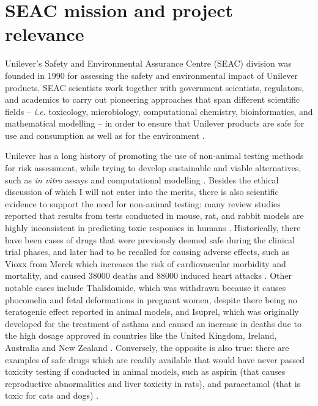 \section{SEAC mission and project relevance}
Unilever's Safety and Environmental Assurance Centre (SEAC) division was founded in 1990 for assessing the safety and environmental impact of Unilever products. SEAC scientists work together with government scientists, regulators, and academics to carry out pioneering approaches that span different scientific fields -- \textit{i.e.} toxicology, microbiology, computational chemistry, bioinformatics, and mathematical modelling -- in order to ensure that Unilever products are safe for use and consumption as well as for the environment \citep{unileverLeadingSafetyEnvironmental2023}.

Unilever has a long history of promoting the use of non-animal testing methods for risk assessment, while trying to develop sustainable and viable alternatives, such as \textit{in vitro} assays and computational modelling \citep{unileverAlternativesAnimalTesting2023}. Besides the ethical discussion of which I will not enter into the merits, there is also scientific evidence to support the need for non-animal testing: many review studies reported that results from tests conducted in mouse, rat, and rabbit models are highly inconsistent in predicting toxic responses in humans \citep{vannormanLimitationsAnimalStudies2020}. Historically, there have been cases of drugs that were previously deemed safe during the clinical trial phases, and later had to be recalled for causing adverse effects, such as Vioxx from Merck which increases the risk of cardiovascular morbidity and mortality, and caused 38000 deaths and 88000 induced heart attacks \citep{juniRiskCardiovascularEvents2004}. Other notable cases include Thalidomide, which was withdrawn because it causes phocomelia and fetal deformations in pregnant women, despite there being no teratogenic effect reported in animal models, and Isuprel, which was originally developed for the treatment of asthma and caused an increase in deaths due to the high dosage approved in countries like the United Kingdom, Ireland, Australia and New Zealand \citep{jalbaThreeGenerationsOngoing2008}. Conversely, the opposite is also true: there are examples of safe drugs which are readily available that would have never passed toxicity testing if conducted in animal models, such as aspirin (that causes reproductive abnormalities and liver toxicity in rats), and paracetamol (that is toxic for cats and dogs) \citep{vannormanLimitationsAnimalStudies2020,villarIbuprofenAspirinAcetaminophen1998}.

